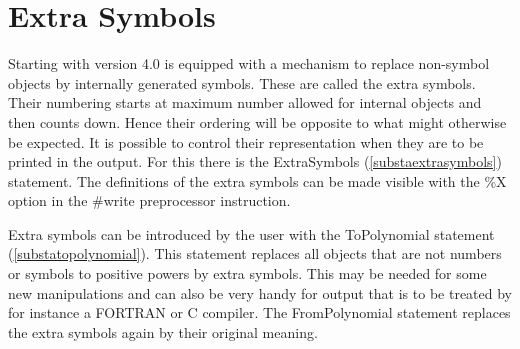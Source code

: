 \section{Extra Symbols}

\label{sect-extrasymbols}
\label{extrasymbols}
Starting with version 4.0 \FORM{} is equipped with a mechanism to replace
non-symbol objects by internally generated symbols. These are called the 
extra symbols. Their numbering starts at maximum number allowed for 
internal objects and then counts down. Hence their ordering will be 
opposite to what might otherwise be expected. It is possible to control 
their representation when they are to be printed in the output. For this 
there is the ExtraSymbols (\ref{substaextrasymbols}) statement. The 
definitions of the extra symbols can be made visible with the \%X option in 
the \#write preprocessor instruction.

Extra symbols can be introduced by the user with the ToPolynomial statement 
(\ref{substatopolynomial}). This statement replaces all objects that are 
not numbers or symbols to positive powers by extra symbols. This may be 
needed for some new manipulations and can also be very handy for output 
that is to be treated by for instance a FORTRAN or C compiler. The 
FromPolynomial statement replaces the extra symbols again by their original 
meaning.

